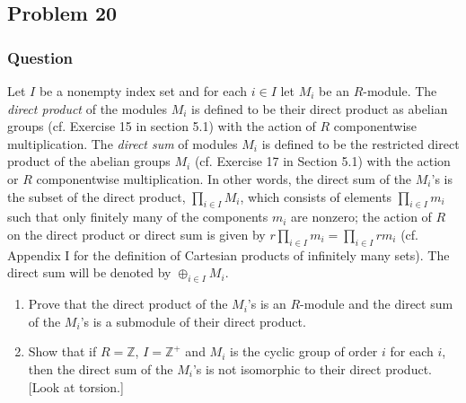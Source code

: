\documentclass[12pt]{article}
\begin{document}
\subsection{Problem 20}
\subsubsection{Question}
Let $I$ be a nonempty index set and for each $i \in I $ let $M_i$ be an $R$-module. The \emph{direct product} of the modules $M_i$ is defined to be their direct product as abelian groups (cf. Exercise 15 in section 5.1) with the action of $R$ componentwise multiplication. The \emph{direct sum} of modules $M_i$ is defined to be the restricted direct product of the abelian groups $M_i$ (cf. Exercise 17 in Section 5.1) with the action or $R$ componentwise multiplication. In other words, the direct sum of the $M_i$'s is the subset of the direct product, $\prod_{i \in I} M_i$, which consists of elements $\prod_{i \in I}m_i$ such that only finitely many of the components  $m_i$ are nonzero; the action of $R$ on the direct product or direct sum is given by $r \prod_{i \in I} m_i = \prod_{i \in I}r m_i$ (cf. Appendix I for the definition of Cartesian products of infinitely many sets). The direct sum will  be denoted by $\oplus_{i \in I} M_i$.
\begin{enumerate}
\item Prove that the direct product of the $M_i$'s is an $R$-module and the direct sum of the $M_i$'s is a submodule of their direct product.
\item Show that if $R = \mathbb{Z}$, $I = \mathbb{Z}^+$ and $M_i$ is the cyclic group of order $i$ for each $i$, then the direct sum of the $M_i$'s is not isomorphic to their direct product. [Look at torsion.]
\end{enumerate}
\end{document}
